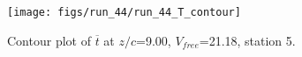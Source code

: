 \begin{figure}[H]
\centering
\texttt{[image: figs/run\_44/run\_44\_T\_contour]}
\caption{Contour plot of $\overline{t}$ at $z/c$=9.00, $V_{free}$=21.18, station 5.}
\label{fig:run_44_T_contour}
\end{figure}



